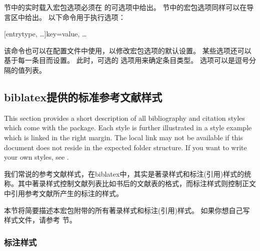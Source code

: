  节中的实时载入宏包选项必须在  的可选项中给出。
 节中的宏包选项同样可以在导言区中给出。
以下命令用于执行选项：

\begin{ltxsyntax}

[entrytype, \dots]{key=value, \dots}


该命令也可以在配置文件中使用，以修改宏包选项的默认设置。
某些选项还可以基于每一条目而设置。
此时，可选的  选项用来确定条目类型。
 选项可以是逗号分隔的值列表。

\end{ltxsyntax}

\subsection{biblatex提供的标准参考文献样式}%
\label{use:xbx}



This section provides a short description of all bibliography and citation styles which come with the \biblatex package. Each style is further illustrated in a style example which is linked in the right margin. The local link may not be available if this document does not reside in the expected folder structure. If you want to write your own styles, see .

我们常说的参考文献样式，在biblatex中，其实是著录样式和标注(引用)样式的统称。其中著录样式控制文献列表比如书后的文献表的格式，而标注样式则控制正文中引用参考文献所产生的标注的样式。

本节将简要描述本宏包附带的所有著录样式和标注(引用)样式。
如果你想自己写样式文件，请参考  节。

\subsubsection{标注样式}%
\label{use:xbx:cbx}

